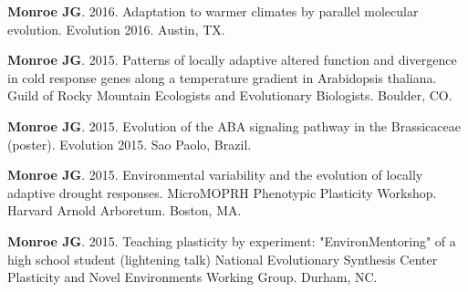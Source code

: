 \documentclass[12pt,english]{article}
\begin{document}
\begin{hangparas}{.5in}{1}
\vspace{0.5ex}\par
\hspace{1em}\textbf{Monroe JG}. 2016. Adaptation to warmer climates by parallel molecular evolution. Evolution 2016. Austin, TX.
\vspace{0.5ex}\par
\hspace{1em}\textbf{Monroe JG}. 2015. Patterns of locally adaptive altered function and divergence in cold response genes along a temperature gradient in Arabidopsis thaliana. Guild of Rocky Mountain Ecologists and Evolutionary Biologists. Boulder, CO.
\vspace{0.5ex}\par
\hspace{1em}\textbf{Monroe JG}. 2015. Evolution of the ABA signaling pathway in the Brassicaceae (poster). Evolution 2015. Sao Paolo, Brazil.
\vspace{0.5ex}\par
\hspace{1em}\textbf{Monroe JG}. 2015. Environmental variability and the evolution of locally adaptive drought responses. MicroMOPRH Phenotypic Plasticity Workshop. Harvard Arnold Arboretum. Boston, MA.
\vspace{0.5ex}\par
\hspace{1em}\textbf{Monroe JG}. 2015. Teaching plasticity by experiment: "EnvironMentoring" of a high school student (lightening talk) National Evolutionary Synthesis Center Plasticity and Novel Environments Working Group. Durham, NC.
\vspace{0.5ex}\par
\end{hangparas}

\end{document}
